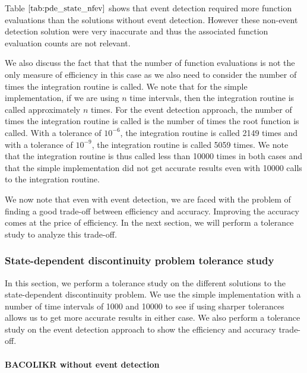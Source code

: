 \documentclass{article}
\begin{document}
Table $\ref{tab:pde_state_nfev}$ shows that event detection required more function evaluations than the solutions without event detection. However these non-event detection solution were very inaccurate and thus the associated function evaluation counts are not relevant. 

We also discuss the fact that that the number of function evaluations is not the only measure of efficiency in this case as we also need to consider the number of times the integration routine is called. We note that for the simple implementation, if we are using $n$ time intervals, then the integration routine is called approximately $n$ times. For the event detection approach, the number of times the integration routine is called is the number of times the root function is called. With a tolerance of $10^{-6}$, the integration routine is called 2149 times and with a tolerance of $10^{-9}$, the integration routine is called 5059 times. We note that the integration routine is thus called less than 10000 times in both cases and that the simple implementation did not get accurate results even with 10000 calls to the integration routine.

We now note that even with event detection, we are faced with the problem of finding a good trade-off between efficiency and accuracy. Improving the accuracy comes at the price of efficiency. In the next section, we will perform a tolerance study to analyze this trade-off.

\subsubsection{State-dependent discontinuity problem tolerance study}
\label{subsubsection:pde_state_tol_study}
In this section, we perform a tolerance study on the different solutions to the state-dependent discontinuity problem. We use the simple implementation with a number of time intervals of 1000 and 10000 to see if using sharper tolerances allows us to get more accurate results in either case. We also perform a tolerance study on the event detection approach to show the efficiency and accuracy trade-off.

\paragraph{BACOLIKR without event detection}
\end{document}
